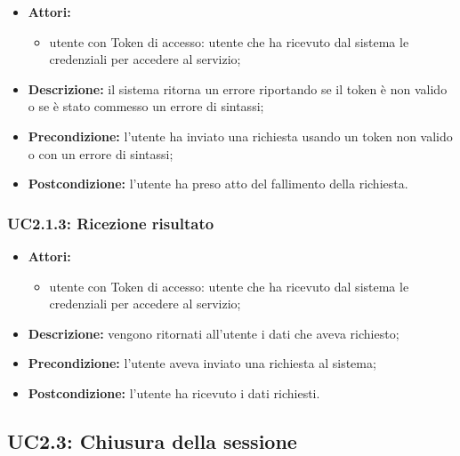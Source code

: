 \begin{itemize}
	\item \textbf{Attori:}
	\begin{itemize}
		\item utente con Token di accesso: utente che ha ricevuto dal sistema le credenziali per accedere al servizio;
	\end{itemize}
	\item \textbf{Descrizione:} il sistema ritorna un errore riportando se il token è non valido o se è stato commesso un errore di sintassi;
	\item \textbf{Precondizione:} l'utente ha inviato una richiesta usando un token non valido o con un errore di sintassi;
	\item \textbf{Postcondizione:} l'utente ha preso atto del fallimento della richiesta.
\end{itemize}

\subsubsection{UC2.1.3: Ricezione risultato}

\begin{itemize}
	\item \textbf{Attori:}
	\begin{itemize}
		\item utente con Token di accesso: utente che ha ricevuto dal sistema le credenziali per accedere al servizio;
	\end{itemize}
	\item \textbf{Descrizione:} vengono ritornati all'utente i dati che aveva richiesto;
	\item \textbf{Precondizione:} l'utente aveva inviato una richiesta al sistema;
	\item \textbf{Postcondizione:} l'utente ha ricevuto i dati richiesti.
\end{itemize}


\pagebreak

\subsection{UC2.3: Chiusura della sessione}


